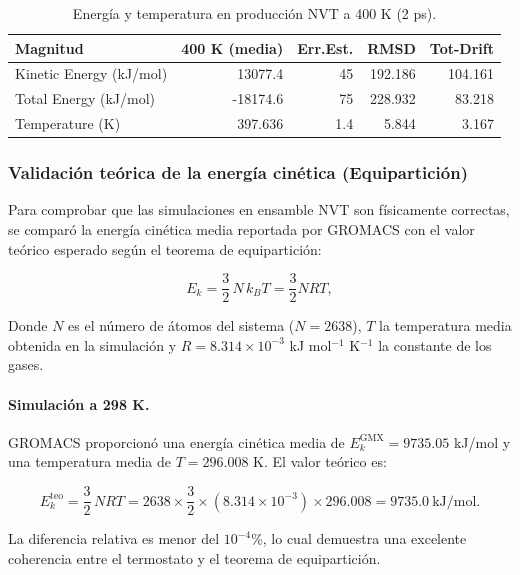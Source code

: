 \documentclass[12pt,a4paper]{article}
\begin{document}
\begin{table}[H]
\centering
\begin{tabular}{lrrrr}
\toprule
\textbf{Magnitud} & \textbf{400 K (media)} & \textbf{Err.Est.} & \textbf{RMSD} & \textbf{Tot-Drift} \\
\midrule
Kinetic Energy (kJ/mol) & 13077.4 & 45  & 192.186 & 104.161 \\
Total Energy (kJ/mol)   & -18174.6 & 75 & 228.932 & 83.218 \\
Temperature (K)         & 397.636  & 1.4 & 5.844  & 3.167 \\
\bottomrule
\end{tabular}
\caption{Energía y temperatura en producción NVT a 400 K (2 ps).}
\end{table}

\subsubsection{Validación teórica de la energía cinética (Equipartición)}

Para comprobar que las simulaciones en ensamble NVT son físicamente correctas,
se comparó la energía cinética media reportada por GROMACS con el valor teórico
esperado según el teorema de equipartición:

\begin{equation}
E_k = \frac{3}{2} \, N \, k_B T = \frac{3}{2} N R T,
\end{equation}

Donde $N$ es el número de átomos del sistema ($N=2638$), $T$ la temperatura media
obtenida en la simulación y $R = 8.314\times 10^{-3}$ kJ mol$^{-1}$ K$^{-1}$ la
constante de los gases.

\paragraph{Simulación a 298 K.}
GROMACS proporcionó una energía cinética media de $E_k^{\mathrm{GMX}} = 9735.05$
kJ/mol y una temperatura media de $T = 296.008$ K. El valor teórico es:

\begin{equation}
E_k^{\mathrm{teo}} = \frac{3}{2} \, N R T
= 2638 \times \frac{3}{2} \times (8.314\times 10^{-3}) \times 296.008
= 9735.0\ \text{kJ/mol}.
\end{equation}

La diferencia relativa es menor del $10^{-4}$\%, lo cual demuestra una excelente
coherencia entre el termostato y el teorema de equipartición.
\end{document}
